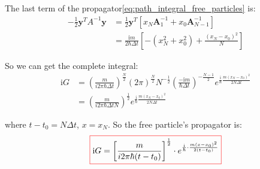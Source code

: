 \begin{example}
    The last term of the propagator\eqref{eq:path_integral_free_particles} is:
    \begin{equation}
    \begin{aligned}
    -\frac{1}{2} \bm{y}^T A^{-1} \bm{y} &= \frac{1}{2} \bm{y}^T [x_N \bm{A}_1^{-1} + x_0 \bm{A}_{N-1}^{-1}] \\
    &= \frac{\mathrm{i}m}{2\hbar\Delta t} \left[-(x_N^2+x_0^2) + \frac{(x_N-x_0)^2}{N}\right]
    \end{aligned}
    \end{equation}

    So we can get the complete integral:
    \begin{equation}
    \begin{aligned}
    \mathrm{i}G &= \left(\frac{m}{i 2\pi\hbar\Delta t}\right)^{\frac{N}{2}} (2\pi)^{\frac{N}{2}} N^{-\frac{1}{2}} 
    \left(\frac{-\mathrm{i}m}{\hbar\Delta t}\right)^{-\frac{N-1}{2}} e^{\frac{\mathrm{i}}{\hbar} \frac{m(x_N-x_0)^2}{2N\Delta t}} \\
    &= \left(\frac{m}{i 2\pi\hbar\Delta t N}\right)^{\frac{1}{2}} e^{\frac{\mathrm{i}}{\hbar} \frac{m(x_N-x_0)^2}{2N\Delta t}}
    \end{aligned}
    \end{equation}

    where $t-t_0=N\Delta t$, $x=x_N$.
    So the free particle's propagator is:
    \begin{equation}
        \colorboxed{
        \mathrm{i}G = \left[\frac{m}{i 2\pi\hbar(t-t_0)}\right]^{\frac{1}{2}} \cdot e^{\frac{\mathrm{i}}{\hbar} \cdot \frac{m(x-x_0)^2}{2(t-t_0)}}
        }
    \end{equation}

\end{example}

\newpage
